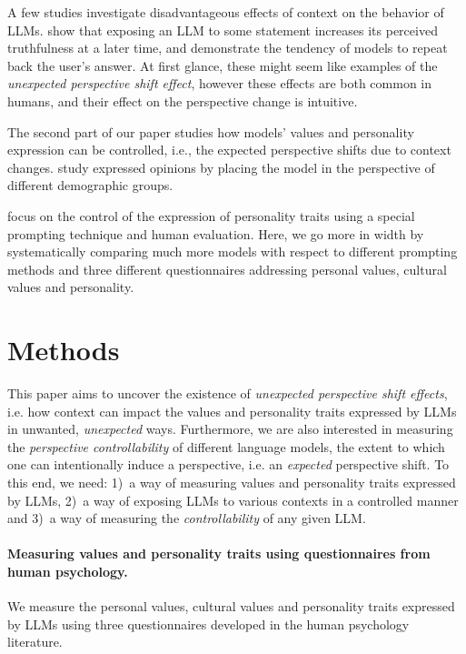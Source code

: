 A few studies investigate disadvantageous effects of context on the behavior of LLMs.
\citet{griffin2023susceptibility} show that exposing an LLM to some statement increases its perceived truthfulness at a later time, and \citet{perez2023discovering} demonstrate the tendency of models to repeat back the user's answer. At first glance, these might seem like examples of the \textit{unexpected perspective shift effect}, however these effects are both common in humans, and their effect on the perspective change is intuitive.

The second part of our paper studies how models' values and personality expression can be controlled, i.e., the expected perspective shifts due to context changes.
\citet{santurkar2023whose} study expressed opinions by placing the model in the perspective of different demographic groups.

\cite{jiang2022mpi} focus on the control of the expression of personality traits using a special prompting technique and human evaluation. Here, we go more in width by systematically comparing much more models with respect to different prompting methods and three different questionnaires addressing personal values, cultural values and personality.

\section{Methods}
\label{sec:methods}

This paper aims to uncover the existence of \textit{unexpected perspective shift effects}, i.e. how context can impact the values and personality traits expressed by LLMs in unwanted, \textit{unexpected} ways. Furthermore, we are also interested in measuring the \textit{perspective controllability} of different language models, the extent to which one can intentionally induce a perspective, i.e. an \textit{expected} perspective shift. To this end, we need: 1)~a way of measuring values and personality traits expressed by LLMs, 2)~a way of exposing LLMs to various contexts in a controlled manner and 3)~a way of measuring the \textit{controllability} of any given LLM. 

\paragraph{Measuring values and personality traits using questionnaires from human psychology.} We measure the personal values, cultural values and personality traits expressed by LLMs using three questionnaires developed in the human psychology literature. 

